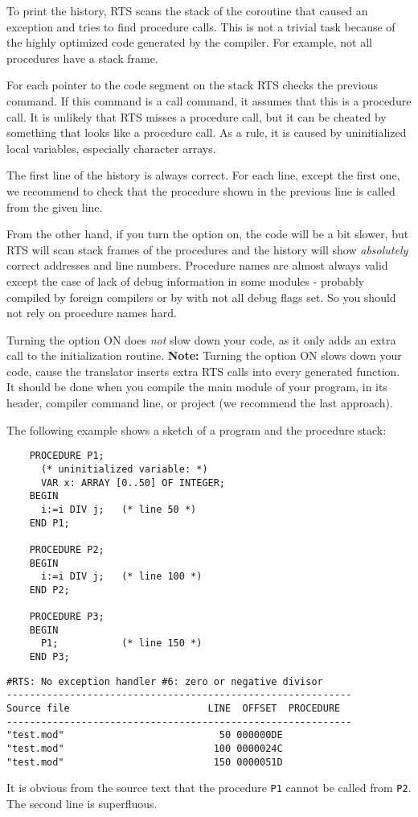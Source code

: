 \ifgencode
To print the history, RTS scans the stack of the coroutine
that caused an exception and tries to find procedure calls. This is
not a trivial task because of the highly optimized code generated by the
compiler. For example, not all procedures have a stack frame.

For each pointer to the code segment on the stack RTS checks the
previous command. If this command is a call command, it assumes that
this is a procedure call. It is unlikely that RTS misses a procedure
call, but it can be cheated by something that looks like a procedure
call. As a rule, it is caused by uninitialized local variables, especially
character arrays.

The first line of the history is always correct. For each line, except
the first one, we recommend to check that the procedure shown in the
previous line is called from the given line.

From the other hand, if you turn the  option on,
the code will be a bit slower, but RTS will scan stack frames of the
procedures and the history will show {\em absolutely} correct addresses
and line numbers. Procedure names are almost always valid except the case
of lack of debug information in some modules - probably
compiled by foreign compilers or by \XDS{} with not all debug flags set.
So you should not rely on procedure names hard.

Turning the  option ON does {\em not} slow down your code,
as it only adds an extra call to the initialization routine.
\else %
{\bf Note:} Turning the  option ON slows down your code,
cause the translator inserts extra RTS calls into every generated function.
\fi
It should be done when you compile the main module of your program, in
its header, compiler command line, or project (we recommend the last approach).

The following example shows a sketch of a program and the procedure
stack:
\begin{verbatim}
    PROCEDURE P1;
      (* uninitialized variable: *)
      VAR x: ARRAY [0..50] OF INTEGER;
    BEGIN
      i:=i DIV j;   (* line 50 *)
    END P1;

    PROCEDURE P2;
    BEGIN
      i:=i DIV j;   (* line 100 *)
    END P2;

    PROCEDURE P3;
    BEGIN
      P1;           (* line 150 *)
    END P3;
\end{verbatim}

\begin{verbatim}
#RTS: No exception handler #6: zero or negative divisor
------------------------------------------------------------
Source file                        LINE  OFFSET  PROCEDURE
------------------------------------------------------------
"test.mod"                           50 000000DE
"test.mod"                          100 0000024C
"test.mod"                          150 0000051D
\end{verbatim}
It is obvious from the source text that the procedure \verb'P1' cannot be
called from \verb'P2'. The second line is superfluous.

